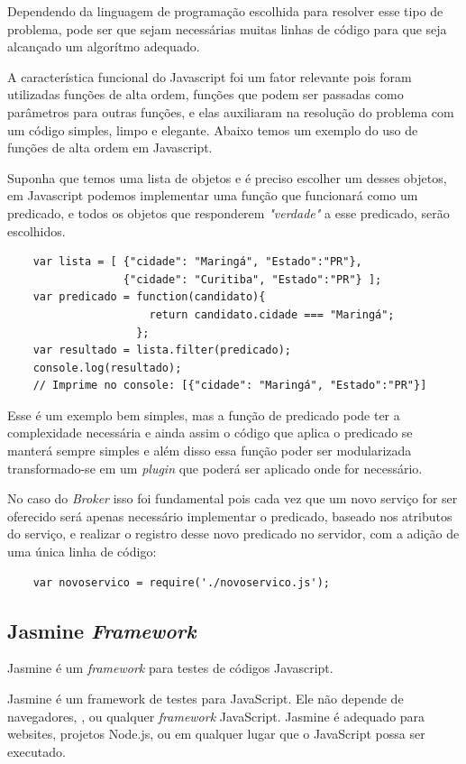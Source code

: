 Dependendo da linguagem de programação escolhida para resolver esse tipo de problema, pode ser que sejam necessárias muitas linhas de código para que seja alcançado um algorítmo adequado.

A característica funcional do Javascript foi um fator relevante pois foram utilizadas funções de alta ordem, funções que podem ser passadas como parâmetros para outras funções, e elas auxiliaram na resolução do problema com um código simples, limpo e elegante. Abaixo temos um exemplo do uso de funções de alta ordem em Javascript.

Suponha que temos uma lista de objetos e é preciso escolher um desses objetos, em Javascript podemos implementar uma função que funcionará como um predicado, e todos os objetos que responderem \textit{"verdade"} a esse predicado, serão escolhidos.

\begin{verbatim}
    var lista = [ {"cidade": "Maringá", "Estado":"PR"},
                  {"cidade": "Curitiba", "Estado":"PR"} ];
    var predicado = function(candidato){
                      return candidato.cidade === "Maringá";
                    };
    var resultado = lista.filter(predicado);
    console.log(resultado);
    // Imprime no console: [{"cidade": "Maringá", "Estado":"PR"}]
\end{verbatim}

Esse é um exemplo bem simples, mas a função de predicado pode ter a complexidade necessária e ainda assim o código que aplica o predicado se manterá sempre simples e além disso essa função poder ser modularizada transformado-se em um \textit{plugin} que poderá ser aplicado onde for necessário.

No caso do \textit{Broker} isso foi fundamental pois cada vez que um novo serviço for ser oferecido será apenas necessário implementar o predicado, baseado nos atributos do serviço, e realizar o registro desse novo predicado no servidor, com a adição de uma única linha de código:
\begin{verbatim}
    var novoservico = require('./novoservico.js');
\end{verbatim}

\subsection{Jasmine \normalfont\itshape Framework}
Jasmine é um \textit{framework} para testes de códigos Javascript.
\begin{citacao}
Jasmine é um framework de testes  para JavaScript. Ele não depende de navegadores, , ou qualquer \textit{framework} JavaScript. Jasmine é adequado para websites, projetos Node.js, ou em qualquer lugar que o JavaScript possa ser executado.\cite{jasmine}
\end{citacao}

